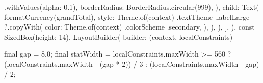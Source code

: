 \documentclass[11pt,a4paper]{article}
\begin{document}
\begin{codeblock}
{{{{                                          .withValues(alpha: 0.1),
                                      borderRadius: BorderRadius.circular(999),
                                    ),
                                    child: Text(
                                      formatCurrency(grandTotal),
                                      style: Theme.of(context)
                                          .textTheme
                                          .labelLarge
                                          ?.copyWith(
                                            color: Theme.of(context)
                                                .colorScheme
                                                .secondary,
                                          ),
                                    ),
                                  ),
                                ],
                              ),
                              const SizedBox(height: 14),
                              LayoutBuilder(
                                builder: (context, localConstraints) {
                                  final gap = 8.0;
                                  final statWidth = localConstraints.maxWidth >=
                                          560
                                      ? (localConstraints.maxWidth -
                                              (gap * 2)) /
                                          3
                                      : (localConstraints.maxWidth - gap) / 2;

}}}}}
\end{codeblock}
\end{document}
